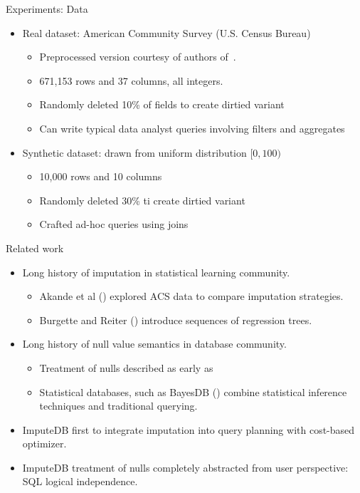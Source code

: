 \documentclass{beamer}
\newcommand{\ProjectName}{ImputeDB}
\begin{document}
\begin{frame}[fragile]{Experiments: Data}
\begin{itemize}
	\item Real dataset: American Community Survey (U.S. Census Bureau)
		\begin{itemize}
			\item Preprocessed version courtesy of authors of~\cite{akande2015empirical}.
			\item 671,153 rows and 37 columns, all integers.
			\item Randomly deleted 10\% of fields to create dirtied variant
			\item Can write typical data analyst queries involving filters and aggregates
		\end{itemize}
	\item Synthetic dataset: drawn from uniform distribution $[0,100)$
		\begin{itemize}
			\item10,000 rows and 10 columns
			\item Randomly deleted 30\% ti create dirtied variant
			\item Crafted ad-hoc queries using joins
		\end{itemize}
\end{itemize}
\end{frame}

\begin{frame}[fragile]{Related work}
\begin{itemize}
	\item Long history of imputation in statistical learning community.
		\begin{itemize}
			\item Akande et al (\cite{akande2015empirical}) explored ACS data to compare imputation strategies.
			\item Burgette and Reiter (\cite{burgette2010multiple}) introduce sequences of regression trees.
		\end{itemize}
	\item Long history of null value semantics in database community.
		\begin{itemize}
			\item Treatment of nulls described as early as  \cite{codd1973understanding}
			\item Statistical databases, such as BayesDB (\cite{mansinghka2015bayesdb}) combine statistical inference techniques and traditional querying.
		\end{itemize}
	\item \ProjectName{} first to integrate imputation into query planning with cost-based optimizer.
	\item \ProjectName{} treatment of nulls completely abstracted from user perspective: SQL logical independence.
\end{itemize}
\end{frame}
\end{document}
